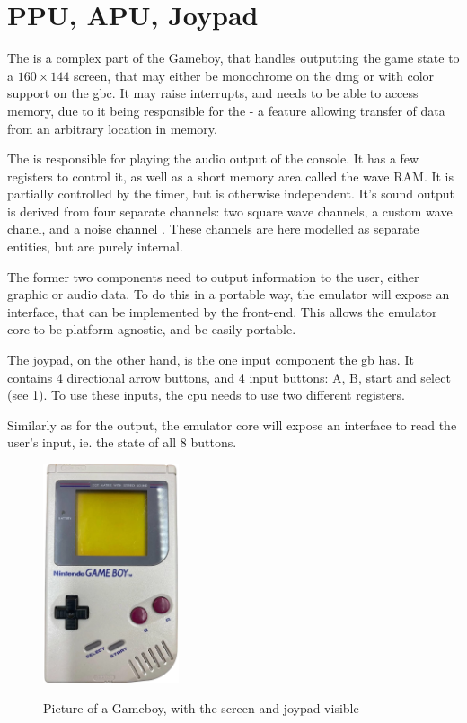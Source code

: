 \documentclass[11pt]{report}
\begin{document}
\section{PPU, APU, Joypad}

The  is a complex part of the Gameboy, that handles outputting the game state to a $160 \times 144$ screen, that may either be monochrome on the \gls{dmg} or with color support on the \gls{gbc}. It may raise interrupts, and needs to be able to access memory, due to it being responsible for the  - a feature allowing transfer of data from an arbitrary location in memory.

The  is responsible for playing the audio output of the console. It has a few registers to control it, as well as a short memory area called the wave RAM. It is partially controlled by the timer, but is otherwise independent. It's sound output is derived from four separate channels: two square wave channels, a custom wave chanel, and a noise channel \cite[Audio]{pandoc}. These channels are here modelled as separate entities, but are purely internal.

The former two components need to output information to the user, either graphic or audio data. To do this in a portable way, the emulator will expose an interface, that can be implemented by the front-end. This allows the emulator core to be platform-agnostic, and be easily portable.

The joypad, on the other hand, is the one input component the \gls{gb} has. It contains 4 directional arrow buttons, and 4 input buttons: A, B, start and select (see \ref{fig:gb-front}). To use these inputs, the \gls{cpu} needs to use two different registers.

Similarly as for the output, the emulator core will expose an interface to read  the user's input, ie. the state of all 8 buttons.

\begin{figure}[h]
    \centering
    \includegraphics[width=4cm]{images/gameboy.png}\\
    \caption{Picture of a Gameboy, with the screen and joypad visible}
    \label{fig:gb-front}
\end{figure}
\end{document}
